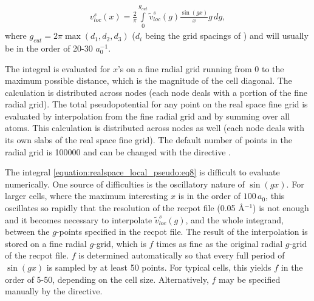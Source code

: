 \documentclass[letterpaper,10pt,english]{sphinxmanual}
\begin{document}
\label{\detokenize{realspace_local_pseudo:equation-eq8}}\begin{equation}\label{equation:realspace_local_pseudo:eq8}
\begin{split}{v^s_{loc}\left(x\right)}= \frac{2}{\pi}\int\limits_0^{g_{cut}}
{\tilde{v}^s_{loc}\left(g\right)}\frac{\sin\left(gx\right)}{x}g\,dg,\end{split}
\end{equation}
where \(g_{cut}=2\pi\max{\left(d_1,d_2,d_3\right)}\) (\(d_i\)
being the grid spacings of ) and will usually be in the
order of 20-30 \(a_0^{-1}\).

The integral is evaluated for \(x\)’s on a fine radial grid
running from \(0\) to the maximum possible distance, which is the
magnitude of the cell diagonal. The calculation is distributed across
nodes (each node deals with a portion of the fine radial grid). The
total pseudopotential for any point on the real space fine grid is
evaluated by interpolation from the fine radial grid and by summing over
all atoms. This calculation is distributed across nodes as well (each
node deals with its own slabs of the real space fine grid). The default
number of points in the radial grid is 100000 and can be changed with
the directive .

The integral \eqref{equation:realspace_local_pseudo:eq8} is difficult to evaluate numerically. One source of
difficulties is the oscillatory nature of \(\sin\left(gx\right)\).
For larger cells, where the maximum interesting \(x\) is in the
order of \(100\,a_0\), this oscillates so rapidly that the
resolution of the recpot file (0.05 Å\(^{-1}\)) is not enough and
it becomes necessary to interpolate
\({\tilde{v}^s_{loc}\left(g\right)}\), and the whole integrand,
between the \(g\)-points specified in the recpot file. The result of
the interpolation is stored on a fine radial \(g\)-grid, which is
\(f\) times as fine as the original radial \(g\)-grid of the
recpot file. \(f\) is determined automatically so that every full
period of \(\sin\left(gx\right)\) is sampled by at least 50 points.
For typical cells, this yields \(f\) in the order of 5-50, depending
on the cell size. Alternatively, \(f\) may be specified manually by
the  directive.
\end{document}

